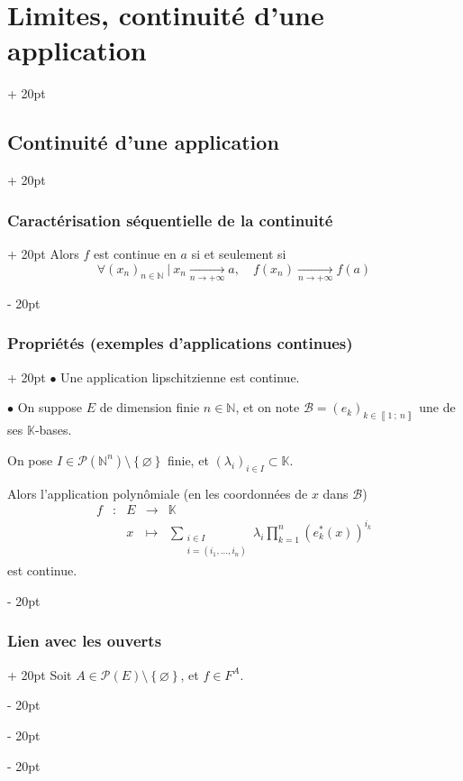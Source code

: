 \documentclass[a4paper, 12pt, twoside]{article}
\newcommand{\N}{\mathbb{N}} %
\newcommand{\K}{\mathbb K}
\newcommand{\nset}[2]{\left\llbracket #1\ ;\ #2 \right\rrbracket}
\newcommand{\tendsto}[1]{\xrightarrow[#1]{}}
\newcommand{\lr}[1]{\left( #1 \right)}
\newcommand{\set}[1]{\left\{ #1 \right\}}
\newcommand{\ind}[1][20pt]{\advance\leftskip + #1}
\newcommand{\deind}[1][20pt]{\advance\leftskip - #1}
\newenvironment{indt}[2][20pt]{#2 \par \ind[#1]}{\par \deind} %
\begin{document}
\begin{indt}{\section{Limites, continuité d'une application}}
\begin{indt}{\subsection{Continuité d'une application}}
\begin{indt}{\subsubsection{Caractérisation séquentielle de la continuité}}
                Alors $f$ est continue en $a$ si et seulement si
                \[
                    \forall \lr{x_n}_{n \in \N}\ |\ x_n \tendsto{n \to +\infty} a,\quad
                    f(x_n) \tendsto{n \to +\infty} f(a)
                \]
            \end{indt}

            \vspace{12pt}
            
            \begin{indt}{\subsubsection{Propriétés (exemples d'applications continues)}}
                $\bullet$ Une application lipschitzienne est continue.

                \vspace{12pt}
                
                $\bullet$ On suppose $E$ de dimension finie $n \in \N$, et on note $\mathcal B = \lr{e_k}_{k \in \nset 1 n}$ une de ses $\K$-bases.

                On pose $I \in \mathcal P(\N^n) \setminus \set \varnothing$ finie, et $\lr{\lambda_i}_{i \in I} \subset \K$.

                \vspace{6pt}
                
                Alors l'application polynômiale (en les coordonnées de $x$ dans $\mathcal B$)
                \[
                    \begin{array}{ccccl}
                        f & : & E & \longrightarrow & \K
                        \\
                          && x & \longmapsto &
                          \displaystyle
                          \sum_{\substack{i \in I \\ i = (i_1, \ldots, i_n)}} \lambda_i \prod_{k = 1}^n \lr{e_k^*(x)}^{i_k}
                    \end{array}
                \]
                est continue.
            \end{indt}

            \vspace{12pt}
            
            \begin{indt}{\subsubsection{Lien avec les ouverts}}
                Soit $A \in \mathcal P(E) \setminus \set \varnothing$, et $f \in F^A$.


\end{indt}
\end{indt}
\end{indt}
\end{document}
